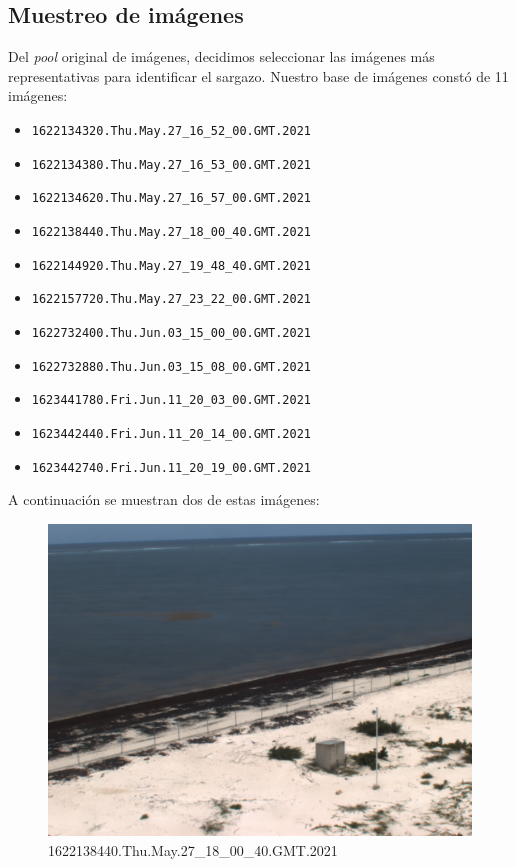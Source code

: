 \documentclass[conference]{IEEEtran}
\begin{document}
\subsection{Muestreo de imágenes}
Del \textit{pool} original de imágenes, decidimos seleccionar las imágenes más representativas para identificar el sargazo. Nuestro base de imágenes constó de 11 imágenes: 

\begin{itemize}
    \item \verb|1622134320.Thu.May.27_16_52_00.GMT.2021|
    \item \verb|1622134380.Thu.May.27_16_53_00.GMT.2021|
    \item \verb|1622134620.Thu.May.27_16_57_00.GMT.2021|
    \item \verb|1622138440.Thu.May.27_18_00_40.GMT.2021|
    \item \verb|1622144920.Thu.May.27_19_48_40.GMT.2021|
    \item \verb|1622157720.Thu.May.27_23_22_00.GMT.2021|
    \item \verb|1622732400.Thu.Jun.03_15_00_00.GMT.2021|
    \item \verb|1622732880.Thu.Jun.03_15_08_00.GMT.2021|
    \item \verb|1623441780.Fri.Jun.11_20_03_00.GMT.2021|
    \item \verb|1623442440.Fri.Jun.11_20_14_00.GMT.2021|
    \item \verb|1623442740.Fri.Jun.11_20_19_00.GMT.2021|
\end{itemize}

A continuación se muestran dos de estas imágenes:

\begin{figure}[H]
    \centering
    \includegraphics[scale=0.13]{imgs/selected_img_2.png}
    \caption{1622138440.Thu.May.27\_18\_00\_40.GMT.2021}
\end{figure}
\end{document}
